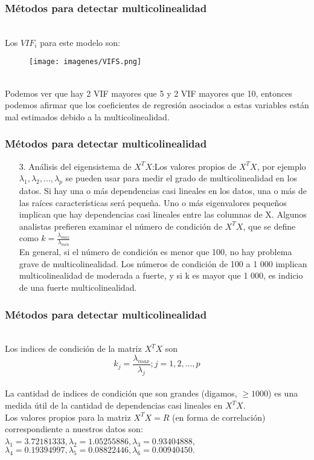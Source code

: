 \documentclass[12pt]{beamer}
\begin{document}
\begin{frame}
\frametitle{Métodos para detectar multicolinealidad}
~\\Los $VIF_{i}$ para este modelo son:
\begin{figure}[!h]
    \begin{center}
        \texttt{[image: imagenes/VIFS.png]}
        \label{fig:Densidad}
    \end{center}
\end{figure}
~\\Podemos ver que hay 2 VIF mayores que 5 y 2 VIF mayores que 10, entonces podemos afirmar que los coeficientes de regresión asociados a estas variables están mal estimados debido a la multicolinealidad.
\end{frame}

\begin{frame}
\frametitle{Métodos para detectar multicolinealidad}
\begin{itemize}
\item[3.]Análisis del eigensistema de $X^{T}X$:Los valores propios de $X^{T}X$, por ejemplo $\lambda_{1},\lambda_{2},...,\lambda_{p}$ se pueden usar para medir el grado de multicolinealidad en los datos. Si hay una o más dependencias casi lineales en los datos, una o más de las raíces características será pequeña. Uno o más eigenvalores pequeños implican que hay dependencias casi lineales entre las columnas de X. Algunos analistas prefieren examinar el número de condición de $X^{T}X$, que se define como $k=\frac{\lambda_{max}}{\lambda_{min}}$
~\\En general, si el número de condición es menor que 100, no hay problema grave de multicolinealidad. Los números de condición de 100 a 1 000 implican multicolinealidad de moderada a fuerte, y si k es mayor que 1 000, es indicio de una fuerte multicolinealidad.
\end{itemize}
\end{frame}

\begin{frame}
\frametitle{Métodos para detectar multicolinealidad}
~\\Los indices de condición de la matriz $X^{T}X$ son
~\\$$k_{j}=\frac{\lambda_{max}}{\lambda_{j}} ; j=1,2,...,p$$
~\\La cantidad de indices de condición que son grandes (digamos, $\geq 1000$) es una medida útil de la cantidad de dependencias casi lineales en $X^{T}X$.
~\\Los valores propios para la matriz $X^{T}X=R$ (en forma de correlación) correspondiente a nuestros datos son:
~\\$\lambda_{1}=3.72181333,\lambda_{2}=1.05255886,\lambda_{3}=0.93404888,$
~\\$\lambda_{4}=0.19394997,\lambda_{5}=0.08822446,\lambda_{6}=0.00940450.$
\end{frame}
\end{document}
